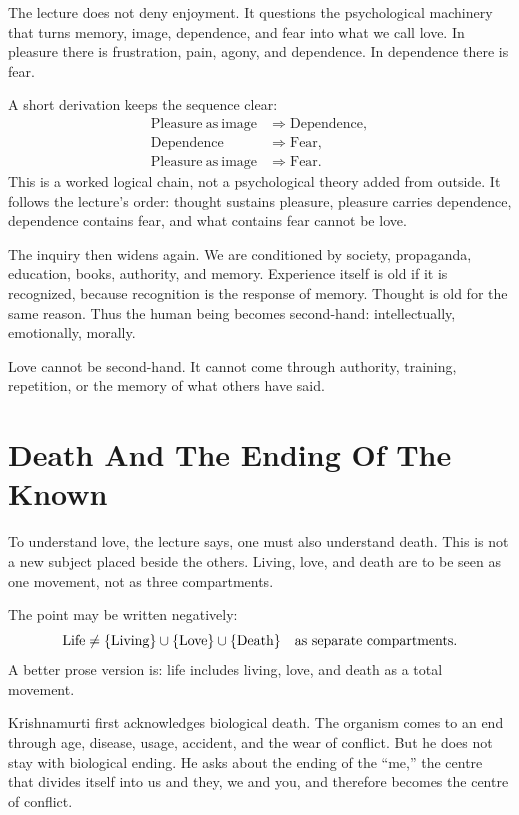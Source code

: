 The lecture does not deny enjoyment. It questions the psychological machinery that turns memory, image, dependence, and fear into what we call love. In pleasure there is frustration, pain, agony, and dependence. In dependence there is fear.

A short derivation keeps the sequence clear:
\begin{align}
\mathrm{Pleasure\ as\ image}
&\Rightarrow \mathrm{Dependence}, \\
\mathrm{Dependence}
&\Rightarrow \mathrm{Fear}, \\
\mathrm{Pleasure\ as\ image}
&\Rightarrow \mathrm{Fear}.
\end{align}
This is a worked logical chain, not a psychological theory added from outside. It follows the lecture's order: thought sustains pleasure, pleasure carries dependence, dependence contains fear, and what contains fear cannot be love.

The inquiry then widens again. We are conditioned by society, propaganda, education, books, authority, and memory. Experience itself is old if it is recognized, because recognition is the response of memory. Thought is old for the same reason. Thus the human being becomes second-hand: intellectually, emotionally, morally.

Love cannot be second-hand. It cannot come through authority, training, repetition, or the memory of what others have said.

\section{Death And The Ending Of The Known}

To understand love, the lecture says, one must also understand death. This is not a new subject placed beside the others. Living, love, and death are to be seen as one movement, not as three compartments.

The point may be written negatively:
\begin{equation}
\mathrm{Life} \neq
\{\mathrm{Living}\}\cup\{\mathrm{Love}\}\cup\{\mathrm{Death}\}
\quad \hbox{as separate compartments.}
\end{equation}
A better prose version is: life includes living, love, and death as a total movement.

Krishnamurti first acknowledges biological death. The organism comes to an end through age, disease, usage, accident, and the wear of conflict. But he does not stay with biological ending. He asks about the ending of the ``me,'' the centre that divides itself into us and they, we and you, and therefore becomes the centre of conflict.

